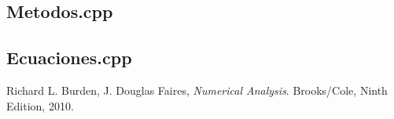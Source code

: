 \documentclass[a4paper,10pt,twoside]{article}
\begin{document}
\subsection{Metodos.cpp}



\subsection{Ecuaciones.cpp}





\begin{thebibliography}{1}
        Richard L. Burden,
        J. Douglas Faires,
        \emph{Numerical Analysis}.
        Brooks/Cole,
        Ninth Edition,
        2010.
\end{thebibliography}
\end{document}
